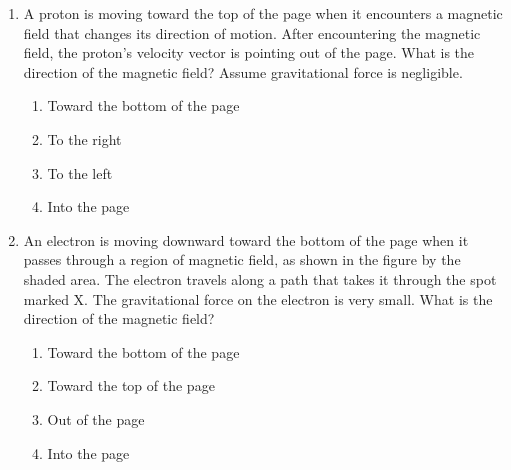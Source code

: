 \documentclass{../../oss-apphys}
\begin{document}
\genheader


\genmultidirections

\gengravity

\raggedcolumns
\begin{multicols}{2}

  \begin{enumerate}[leftmargin=18pt]

  \item A proton is moving toward the top of the page when it encounters a
    magnetic field that changes its direction of motion. After encountering
    the magnetic field, the proton's velocity vector is pointing out of the
    page. What is the direction of the magnetic field? Assume gravitational
    force is negligible.
    \begin{enumerate}[noitemsep,topsep=0pt,leftmargin=18pt,label=(\Alph*)]
    \item Toward the bottom of the page
    \item To the right
    \item To the left
    \item Into the page
    \end{enumerate}

  \item An electron is moving downward toward the bottom of the page when it
    passes through a region of magnetic field, as shown in the figure by the
    shaded area. The electron travels along a path that takes it through the
    spot marked X. The gravitational force on the electron is very small. What
    is the direction of the magnetic field?

    \begin{center}
    \end{center}
    \begin{enumerate}[noitemsep,topsep=0pt,leftmargin=18pt,label=(\Alph*)]
    \item Toward the bottom of the page
    \item Toward the top of the page
    \item Out of the page
    \item Into the page
    \end{enumerate}
  \end{enumerate}


\end{multicols}
\end{document}
